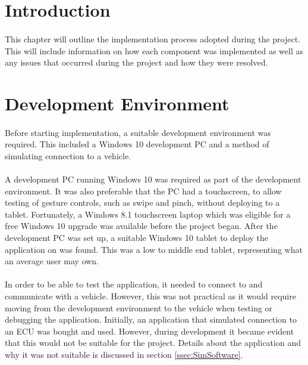 \section{Introduction}
	\paragraph{}{
	This chapter will outline the implementation process adopted during the project. This will include information on how each component was implemented as well as any issues that occurred during the project and how they were resolved.
	}
\section{Development Environment}{
	\paragraph{}{
	Before starting implementation, a suitable development environment was required. This included a Windows 10 development PC and a method of simulating connection to a vehicle. 
	}
	\paragraph{}{
	A development PC running Windows 10 was required as part of the development environment. It was also preferable that the PC had a touchscreen, to allow testing of gesture controls, such as swipe and pinch, without deploying to a tablet. Fortunately, a Windows 8.1 touchscreen laptop which was eligible for a free Windows 10 upgrade was available before the project began. After the development PC was set up, a suitable Windows 10 tablet to deploy the application on was found. This was a low to middle end tablet, representing what an average user may own.
	}
	
	\paragraph{}{
	In order to be able to test the application, it needed to connect to and communicate with a vehicle. However, this was not practical as it would require moving from the development environment to the vehicle when testing or debugging the application. Initially, an application that simulated connection to an ECU was bought and used. However, during development it became evident that this would not be suitable for the project. Details about the application and why it was not suitable is discussed in section \ref{ssec:SimSoftware}.
	}
	
}
